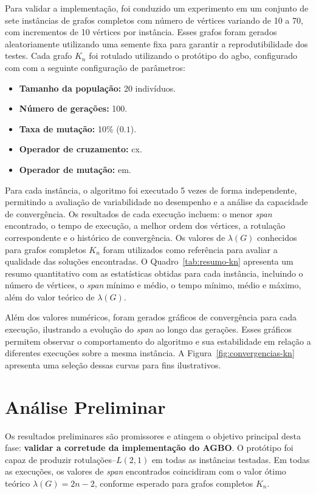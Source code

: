 Para validar a implementação, foi conduzido um experimento em um conjunto de sete instâncias de grafos completos com número de vértices variando de 10 a 70, com incrementos de 10 vértices por instância. Esses grafos foram gerados aleatoriamente utilizando uma semente fixa para garantir a reprodutibilidade dos testes. Cada grafo \( K_n \) foi rotulado utilizando o protótipo do \gls{agbo}, configurado com com a seguinte configuração de parâmetros:

\begin{itemize}
    \item \textbf{Tamanho da população:} 20 indivíduos.
    \item \textbf{Número de gerações:} 100.
    \item \textbf{Taxa de mutação:} 10\% ($0.1$).
    \item \textbf{Operador de cruzamento:} \gls{cx}.
    \item \textbf{Operador de mutação:} \gls{em}.
\end{itemize}

Para cada instância, o algoritmo foi executado 5 vezes de forma independente, permitindo a avaliação de variabilidade no desempenho e a análise da capacidade de convergência. Os resultados de cada execução incluem: o menor \textit{span} encontrado, o tempo de execução, a melhor ordem dos vértices, a rotulação correspondente e o histórico de convergência. Os valores de \(\lambda(G)\) conhecidos para grafos completos \( K_n \) foram utilizados como referência para avaliar a qualidade das soluções encontradas. O Quadro~\ref{tab:resumo-kn} apresenta um resumo quantitativo com as estatísticas obtidas para cada instância, incluindo o número de vértices, o \textit{span} mínimo e médio, o tempo mínimo, médio e máximo, além do valor teórico de \(\lambda(G)\).

Além dos valores numéricos, foram gerados gráficos de convergência para cada execução, ilustrando a evolução do \textit{span} ao longo das gerações. Esses gráficos permitem observar o comportamento do algoritmo e sua estabilidade em relação a diferentes execuções sobre a mesma instância. A Figura~\ref{fig:convergencias-kn} apresenta uma seleção dessas curvas para fins ilustrativos.

\section{Análise Preliminar}

Os resultados preliminares são promissores e atingem o objetivo principal desta fase: \textbf{validar a corretude da implementação do AGBO}. O protótipo foi capaz de produzir rotulações–$L(2,1)$ em todas as instâncias testadas. Em todas as execuções, os valores de \textit{span} encontrados coincidiram com o valor ótimo teórico \(\lambda(G) = 2n - 2\), conforme esperado para grafos completos \(K_n\).

